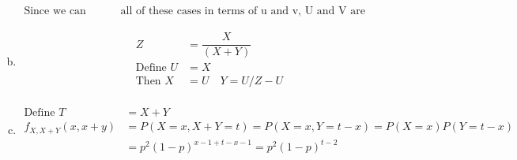 \documentclass{article}
\begin{document}
\begin{flushleft}
\begin{enumerate}[(a)]
\begin{align*}
\text{Since we can factor}&\text{ all of these cases in terms of u and v, U and V are independent }
\end{align*}
\item 
\begin{align*}
Z&=\dfrac{X}{(X+Y)}\\
\text{Define } U&=X\\
\text{Then } X&=U \quad Y=U/Z-U\\
\end{align*}
\item
\begin{align*}
\text{Define } T&=X+Y\\
f_{X,X+Y}(x,x+y)&=P(X=x,X+Y=t)=P(X=x,Y=t-x)=P(X=x)P(Y=t-x)\\
&=p^2(1-p)^{x-1+t-x-1}=p^2(1-p)^{t-2}
\end{align*}
\end{enumerate}

\end{flushleft}
\end{document}
